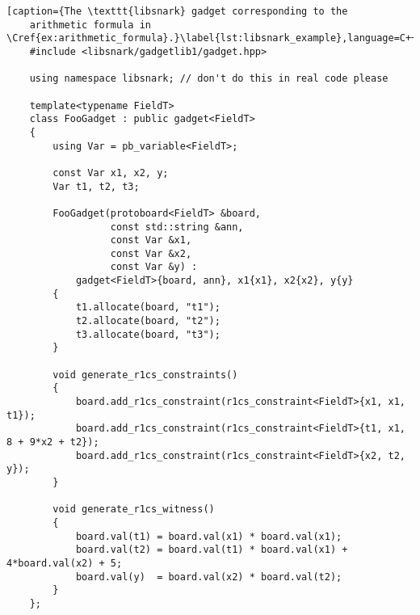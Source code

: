\begin{algorithm}
  \centering
  \begin{lstlisting}[caption={The \texttt{libsnark} gadget corresponding to the 
    arithmetic formula in \Cref{ex:arithmetic_formula}.}\label{lst:libsnark_example},language=C++]
    #include <libsnark/gadgetlib1/gadget.hpp>

    using namespace libsnark; // don't do this in real code please

    template<typename FieldT>
    class FooGadget : public gadget<FieldT>
    {
        using Var = pb_variable<FieldT>;

        const Var x1, x2, y;
        Var t1, t2, t3;

        FooGadget(protoboard<FieldT> &board, 
                  const std::string &ann,
                  const Var &x1, 
                  const Var &x2, 
                  const Var &y) : 
            gadget<FieldT>{board, ann}, x1{x1}, x2{x2}, y{y}
        {
            t1.allocate(board, "t1");
            t2.allocate(board, "t2");
            t3.allocate(board, "t3");
        }

        void generate_r1cs_constraints()
        {
            board.add_r1cs_constraint(r1cs_constraint<FieldT>{x1, x1, t1});
            board.add_r1cs_constraint(r1cs_constraint<FieldT>{t1, x1, 8 + 9*x2 + t2});
            board.add_r1cs_constraint(r1cs_constraint<FieldT>{x2, t2, y});
        }

        void generate_r1cs_witness()
        {
            board.val(t1) = board.val(x1) * board.val(x1);
            board.val(t2) = board.val(t1) * board.val(x1) + 4*board.val(x2) + 5;
            board.val(y)  = board.val(x2) * board.val(t2);
        }
    };
  \end{lstlisting}
\end{algorithm}


